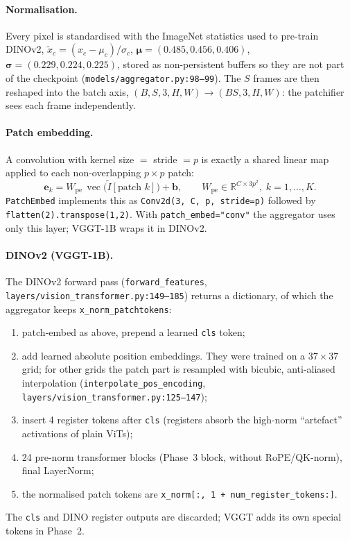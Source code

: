 \documentclass[11pt,a4paper]{article}
\newcommand{\src}[1]{\texttt{\small #1}}
\begin{document}
\paragraph{Normalisation.} Every pixel is standardised with the ImageNet statistics used to pre-train DINOv2,
$\tilde{x}_c = (x_c - \mu_c)/\sigma_c$, $\bm\mu = (0.485, 0.456, 0.406)$, $\bm\sigma = (0.229, 0.224, 0.225)$, stored as
non-persistent buffers so they are not part of the checkpoint (\src{models/aggregator.py:98--99}). The $S$ frames are then reshaped into
the batch axis, $(B,S,3,H,W)\to(BS,3,H,W)$: the patchifier sees each frame independently.

\paragraph{Patch embedding.} A convolution with kernel size $=$ stride $=p$ is exactly a shared linear map applied to
each non-overlapping $p\times p$ patch:
\[
  \mathbf{e}_k = W_{\text{pe}}\,\operatorname{vec}\!\big(\tilde{I}[\text{patch }k]\big) + \mathbf{b},\qquad
  W_{\text{pe}}\in\mathbb{R}^{C\times 3p^2},\; k=1,\dots,K .
\]
\texttt{PatchEmbed} implements this as \texttt{Conv2d(3, C, p, stride=p)} followed by \texttt{flatten(2).transpose(1,2)}.
With \texttt{patch\_embed="conv"} the aggregator uses only this layer; VGGT-1B wraps it in DINOv2.

\paragraph{DINOv2 (VGGT-1B).} The DINOv2 forward pass (\texttt{forward\_features},
\src{layers/vision\_transformer.py:149--185}) returns a dictionary, of which the aggregator keeps \texttt{x\_norm\_patchtokens}:
\begin{enumerate}[nosep]
  \item patch-embed as above, prepend a learned \texttt{cls} token;
  \item add learned absolute position embeddings. They were trained on a $37\times37$ grid; for other grids the patch part is
        resampled with bicubic, anti-aliased interpolation (\texttt{interpolate\_pos\_encoding}, \src{layers/vision\_transformer.py:125--147});
  \item insert 4 register tokens after \texttt{cls} (registers absorb the high-norm ``artefact'' activations of plain ViTs);
  \item 24 pre-norm transformer blocks (Phase~3 block, without RoPE/QK-norm), final LayerNorm;
  \item the normalised patch tokens are \texttt{x\_norm[:, 1 + num\_register\_tokens:]}.
\end{enumerate}
The \texttt{cls} and DINO register outputs are discarded; VGGT adds its own special tokens in Phase~2.
\end{document}
